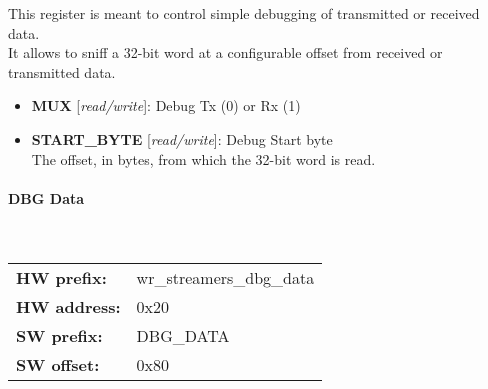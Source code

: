 \vspace{12pt}
This register is meant to control simple debugging of transmitted or received data.\\    It allows to sniff a 32-bit word at a configurable offset from received or transmitted data.

\vspace{12pt}
\noindent
{}

\begin{itemize}
\item \begin{small}
{\bf 
MUX
} [\emph{read/write}]: Debug Tx (0) or Rx (1)
\end{small}
\item \begin{small}
{\bf 
START\_BYTE
} [\emph{read/write}]: Debug Start byte
\\
The offset, in bytes, from which the 32-bit word is read.
\end{small}
\end{itemize}
\paragraph*{DBG Data}\mbox{}\\\vskip 6pt
\begin{tabular}{l l }
{\bf HW prefix:}  & wr\_streamers\_dbg\_data\\
{\bf HW address:}  & 0x20\\
{\bf SW prefix:}  & DBG\_DATA\\
{\bf SW offset:}  & 0x80\\
\end{tabular}


